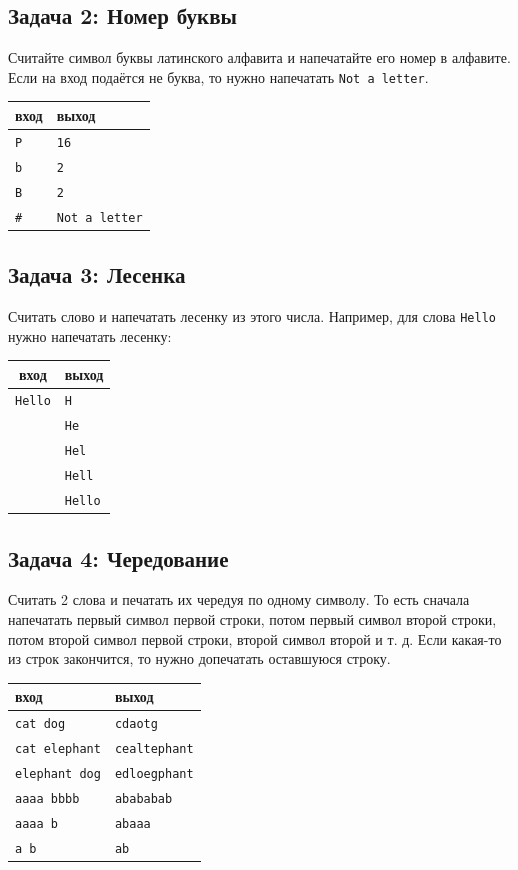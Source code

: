 \documentclass{article}
\begin{document}
\subsection*{Задача 2: Номер буквы}
Считайте символ буквы латинского алфавита и напечатайте его номер в алфавите. Если на вход подаётся не буква, то нужно напечатать \texttt{Not a letter}.
\begin{center}
\begin{tabular}{ l | l }
 вход & выход \\ \hline
 \texttt{P} & \texttt{16} \\
 \texttt{b} & \texttt{2} \\
 \texttt{B} & \texttt{2} \\
 \texttt{\#} & \texttt{Not a letter}\\ 
\end{tabular}
\end{center}

\subsection*{Задача 3: Лесенка}
Считать слово и напечатать лесенку из этого числа. Например, для слова \texttt{Hello} нужно напечатать лесенку: 
\begin{center}
\begin{center}
\begin{tabular}{ c | l }
 вход & выход \\ \hline
 \texttt{Hello} & \texttt{H}  \\ 
 & \texttt{He} \\
 & \texttt{Hel} \\
 & \texttt{Hell} \\
 & \texttt{Hello}\\ 
\end{tabular}
\end{center}
\end{center}

\subsection*{Задача 4: Чередование}
Считать 2 слова и печатать их чередуя по одному символу. То есть сначала напечатать первый символ первой строки, потом первый символ второй строки, потом второй символ первой строки, второй символ второй и т. д. Если какая-то из строк закончится, то нужно допечатать оставшуюся строку.
\begin{center}
\begin{tabular}{ l | l }
 вход & выход \\ \hline
 \texttt{cat dog} & \texttt{cdaotg}  \\ 
 \texttt{cat elephant} & \texttt{cealtephant} \\
 \texttt{elephant dog} & \texttt{edloegphant} \\
 \texttt{aaaa bbbb} & \texttt{abababab} \\
 \texttt{aaaa b} & \texttt{abaaa}\\ 
 \texttt{a b} & \texttt{ab}\\ 
\end{tabular}
\end{center}
\end{document}
